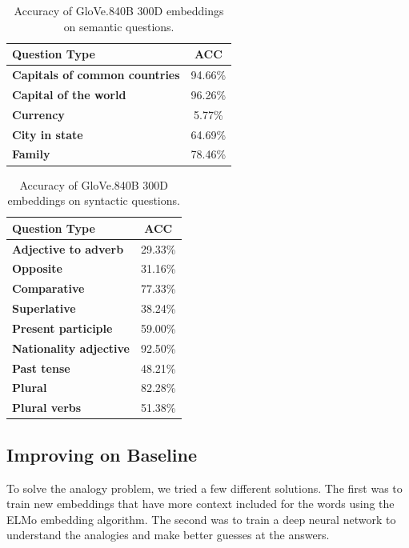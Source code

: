 \documentclass[11pt]{article}
\begin{document}
\begin{table}[h]
\begin{center}
\begin{tabular}{|l|c|}
\hline\bf Question Type & \bf ACC \\\hline
\bf Capitals of common countries & 94.66\% \\
\bf Capital of the world & 96.26\% \\
\bf Currency & 5.77\% \\
\bf City in state & 64.69\% \\
\bf Family & 78.46\% \\ \hline
\end{tabular}
\end{center}
\caption{\label{font-table} Accuracy of GloVe.840B 300D embeddings on semantic questions.}
\end{table}


\begin{table}[h]
\begin{center}
\begin{tabular}{|l|c|}
\hline\bf Question Type & ACC \\\hline
\bf Adjective to adverb & 29.33\% \\
\bf Opposite & 31.16\% \\
\bf Comparative & 77.33\% \\
\bf Superlative & 38.24\% \\
\bf Present participle & 59.00\% \\
\bf Nationality adjective & 92.50\% \\
\bf Past tense & 48.21\% \\
\bf Plural & 82.28\% \\
\bf Plural verbs & 51.38\% \\\hline
\end{tabular}
\end{center}
\caption{\label{font-table} Accuracy of GloVe.840B 300D embeddings on syntactic questions.}
\end{table}

\subsection{Improving on Baseline}

To solve the analogy problem, we tried a few different solutions. The first was
to train new embeddings that have more context included for the words using the
ELMo embedding algorithm. The second was to train a deep neural
network to understand the analogies and make better guesses at the answers.
\end{document}
